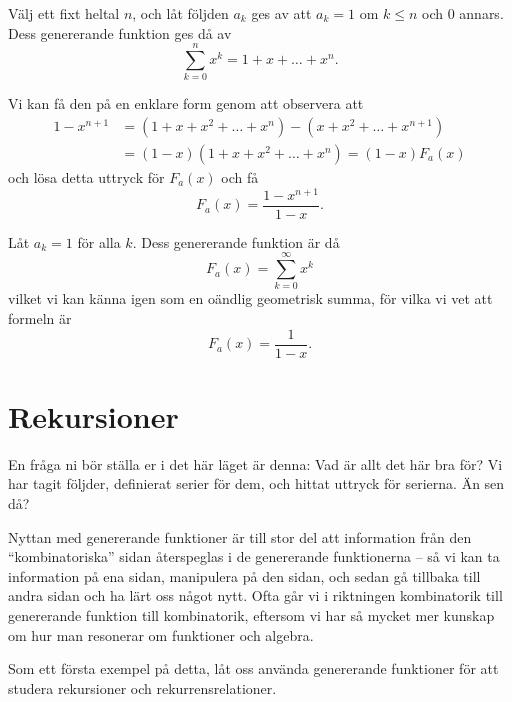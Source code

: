 \documentclass[nobib]{tufte-handout}
\begin{document}
\begin{example}
    Välj ett fixt heltal $n$, och låt följden $a_k$ ges av att $a_k = 1$ om $k \leq n$ och $0$ annars. Dess genererande funktion ges då av
    $$\sum_{k=0}^{n} x^k = 1 + x + \ldots + x^n.$$

    Vi kan få den på en enklare form genom att observera att
    \begin{align*}
        1 - x^{n+1} &= (1 + x + x^2 + \ldots + x^n) - (x  + x^2 + \ldots + x^{n+1})\\
        &= (1 - x)(1 + x + x^2 + \ldots + x^n) = (1 - x)F_a(x)
    \end{align*}
    och lösa detta uttryck för $F_a(x)$ och få
    $$F_a(x) = \frac{1 - x^{n+1}}{1 - x}.$$
\end{example}

\begin{example}
    Låt $a_k = 1$ för alla $k$. Dess genererande funktion är då
    $$F_a(x) = \sum_{k=0}^{\infty} x^k$$
    vilket vi kan känna igen som en oändlig geometrisk summa, för vilka vi vet att formeln är
    $$F_a(x) = \frac{1}{1-x}.$$
\end{example}

\section{Rekursioner}

En fråga ni bör ställa er i det här läget är denna: Vad är allt det här bra för? Vi har tagit följder, definierat serier för dem, och hittat uttryck för serierna. Än sen då?

Nyttan med genererande funktioner är till stor del att information från den ``kombinatoriska'' sidan återspeglas i de genererande funktionerna -- så vi kan ta information på ena sidan, manipulera på den sidan, och sedan gå tillbaka till andra sidan och ha lärt oss något nytt. Ofta går vi i riktningen kombinatorik till genererande funktion till kombinatorik, eftersom vi har så mycket mer kunskap om hur man resonerar om funktioner och algebra.

Som ett första exempel på detta, låt oss använda genererande funktioner för att studera rekursioner och rekurrensrelationer.
\end{document}
